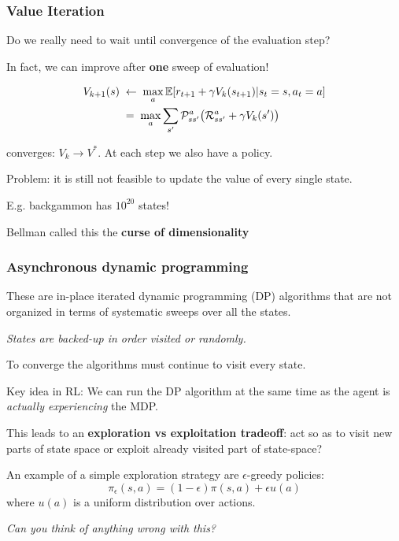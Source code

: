 \begin{frame}
\frametitle{Value Iteration}

Do we really need to wait until convergence of the evaluation step?

In fact, we can improve after {\bf one} sweep of evaluation!

\[
\begin{split}
V_{k+1}(s)\;&\leftarrow\;\max_a \mathbb{E}[ r_{t+1}+ \gamma V_k(s_{t+1})|s_t=s,a_t=a] \\
&=\;\max_a \sum_{s'} {\mathcal P}_{ss'}^a \big( {\mathcal R}_{ss'}^a + \gamma V_k(s')\big)
\end{split}
\]

converges: $V_k \longrightarrow V^*$. At each step we also have a
policy. 

Problem: it is still not feasible to update the
value of every single state.

E.g. backgammon has $10^{20}$ states!

Bellman called this the {\bf curse of dimensionality}
\end{frame}

\begin{frame}
\frametitle{Asynchronous dynamic programming}

These are in-place iterated dynamic programming (DP) algorithms that
are not organized in terms of systematic sweeps over all the states.

{\em States are backed-up in order visited or randomly.}

To converge the algorithms must continue to visit every state.

Key idea in RL: We can run the DP algorithm at the same time as the
agent is {\em actually experiencing} the MDP.

This leads to an {\bf exploration vs exploitation tradeoff}: act so as to visit
new parts of state space or exploit already visited part of state-space?

An example of a simple exploration strategy are $\epsilon$-greedy
policies: 
\[
\pi_{\epsilon}(s,a) = (1-\epsilon) \pi(s,a) + \epsilon u(a)
\] 
where $u(a)$ is a uniform distribution over actions.

{\em Can you think of anything wrong with this?}
\end{frame}

